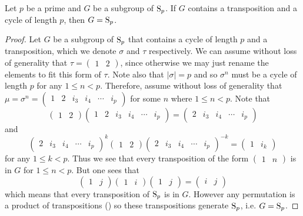 \begin{lemma}\label{lemma-subgroup-containing-transposition-and-maximal-length-cycle-is-whole-symmetric-group}
    Let $p$ be a prime and $G$ be a subgroup of $\mathrm{S}_{p}$. If $G$ contains a transposition and a cycle of length $p$, then $G = \mathrm{S}_{p}$.
\end{lemma}
\begin{proof}
    Let $G$ be a subgroup of $\mathrm{S}_{p}$ that contains a cycle of length $p$ and a transposition, which we denote $\sigma$ and $\tau$ respectively. We can assume without loss of generality that $\tau = \begin{pmatrix}1&2\end{pmatrix}$, since otherwise we may just rename the elements to fit this form of $\tau$. Note also that $|\sigma| = p$ and so $\sigma^n$ must be a cycle of length $p$ for any $1 \leq n < p$. Therefore, assume without loss of generality that $\mu = \sigma^n = \begin{pmatrix}1&2&i_3&i_4&\cdots&i_p\end{pmatrix}$ for some $n$ where $1 \leq n < p$. Note that
    \[
        \begin{pmatrix}1&2\end{pmatrix}\begin{pmatrix}1&2&i_3&i_4&\cdots&i_p\end{pmatrix} = \begin{pmatrix}2&i_3&i_4&\cdots&i_p\end{pmatrix}
    \]
    and
    \[
        \begin{pmatrix}2&i_3&i_4&\cdots&i_p\end{pmatrix}^k\begin{pmatrix}1&2\end{pmatrix}\begin{pmatrix}2&i_3&i_4&\cdots&i_p\end{pmatrix}^{-k} = \begin{pmatrix}1&i_k\end{pmatrix}
    \]
    for any $1 \leq k < p$. Thus we see that every transposition of the form $\begin{pmatrix}1&n\end{pmatrix}$ is in $G$ for $1 \leq n < p$. But one sees that
    \[
        \begin{pmatrix}1&j\end{pmatrix}\begin{pmatrix}1&i\end{pmatrix}\begin{pmatrix}1&j\end{pmatrix} = \begin{pmatrix}i&j\end{pmatrix}
    \]
    which means that every transposition of $\mathrm{S}_{p}$ is in $G$. However any permutation is a product of transpositions () so these transpositions generate $\mathrm{S}_{p}$, i.e. $G = \mathrm{S}_{p}$.
\end{proof}

